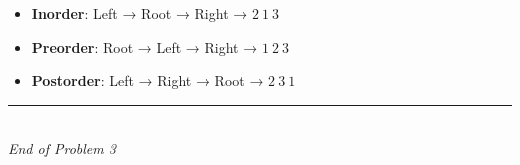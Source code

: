 \documentclass[12pt,a4paper]{article}
\begin{document}
\begin{itemize}
  \item \textbf{Inorder}: Left → Root → Right → $2\ 1\ 3$  
  \item \textbf{Preorder}: Root → Left → Right → $1\ 2\ 3$  
  \item \textbf{Postorder}: Left → Right → Root → $2\ 3\ 1$  
\end{itemize}

\vfill
\begin{center}
    \rule{0.8\textwidth}{0.4pt} \\[0.5em]
    \textit{End of Problem 3}
\end{center}
\end{document}
